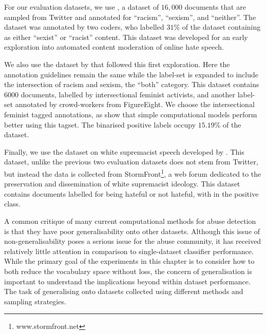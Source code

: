 For our evaluation datasets, we use \citet{Waseem-Hovy:2016}, a dataset of $16,000$ documents that are sampled from Twitter and annotated for ``racism'', ``sexism'', and ``neither''. The dataset was annotated by two coders, who labelled $31$\% of the dataset containing as either ``sexist'' or ``racist'' content. This dataset was developed for an early exploration into automated content moderation of online hate speech.

We also use the dataset by \citet{Waseem:2016} that followed this first exploration. Here the annotation guidelines remain the same while the label-set is expanded to include the intersection of racism and sexism, the ``both'' category. This dataset contains $6000$ documents, labelled by intersectional feminist activists, and another label-set annotated by crowd-workers from FigureEight. We choose the intersectional feminist tagged annotations, as \citet{Waseem:2016} show that simple computational models perform better using this tagset. The binarised positive labels occupy $15.19$\% of the dataset.

Finally, we use the dataset on white supremacist speech developed by \citet{Garcia:2019}. This dataset, unlike the previous two evaluation datasets does not stem from Twitter, but instead the data is collected from StormFront\footnote{www.stormfront.net}, a web forum dedicated to the preservation and dissemination of white supremacist ideology. This dataset contains  documents labelled for being hateful or not hateful, with  in the positive class.




A common critique of many current computational methods for abuse detection is that they have poor generalisability onto other datasets. Although this issue of non-generalisability poses a serious issue for the abuse community, it has received relatively little attention \citep{Waseem:2016,Waseem:2018,Karan:2018,Wiegand:2019,Swamy:2019,Fortuna:2021,Glavas:2020} in comparison to single-dataset classifier performance. While the primary goal of the experiments in this chapter is to consider how to both reduce the vocabulary space without loss, the concern of generalisation is important to understand the implications beyond within dataset performance. The task of generalising onto datasets collected using different methods and sampling strategies.

